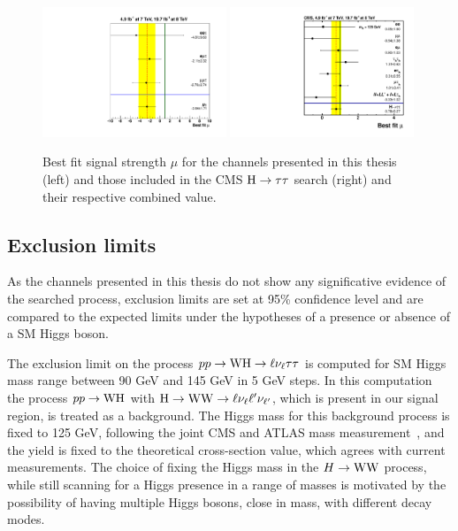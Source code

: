 \begin{figure}
        \centering
	\includegraphics[width=0.49\textwidth]{4_Analisys/pics/limits/mu_values.pdf}
	\includegraphics[width=0.49\textwidth]{1_Introduction_Th_and_Exp/pics/BestFit_sm_per_chn.pdf}
       \caption{Best fit signal strength $\mu$ for the channels presented in this thesis (left) and those included in the CMS $\mathrm{H} \rightarrow \tau \tau$ search (right) and their respective combined value.}
       \label{fig:mu_vals}
\end{figure}



\subsection{Exclusion limits}

As the channels presented in this thesis do not show any significative evidence of the searched process, exclusion limits are set at 95\% confidence level and are compared to the expected limits under the hypotheses of a presence or absence of a SM Higgs boson.

The exclusion limit on the process $pp\rightarrow\mathrm{W}\mathrm{H}\rightarrow\ell\nu_\ell\tau\tau$ is computed for SM Higgs mass range between 90 GeV and 145 GeV in 5 GeV steps. In this computation the process $pp\rightarrow\mathrm{W}\mathrm{H}$ with $\mathrm{H}\rightarrow\mathrm{W}\mathrm{W}\rightarrow\ell\nu_{\ell}\ell'\nu_{\ell'}$, which is present in our signal region, is treated as a background. The Higgs mass for this background process is fixed to 125 GeV, following the joint CMS and ATLAS mass measurement~\cite{CMS:2014ega, Aad:2014aba}, and the yield is fixed to the theoretical cross-section value, which agrees with current measurements. The choice of fixing the Higgs mass in the $H\rightarrow\mathrm{W}\mathrm{W}$ process, while still scanning for a Higgs presence in a range of masses is motivated by the possibility of having multiple Higgs bosons, close in mass, with different decay modes.

